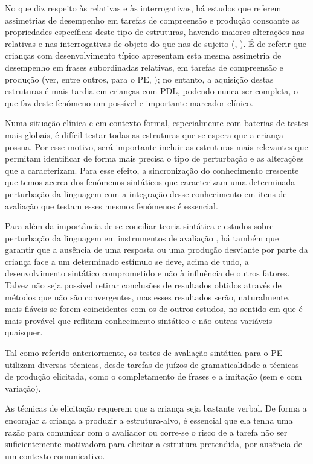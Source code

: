 \documentclass[output=paper,colorlinks,citecolor=brown,booklanguage=portuguese]{langscibook}
\begin{document}
No que diz respeito às relativas e às interrogativas, há estudos que referem assimetrias de desempenho em tarefas de compreensão e produção consoante as propriedades específicas deste tipo de estruturas, havendo maiores alterações nas relativas e nas interrogativas de objeto do que nas de sujeito (\citealp{Friedmann2011, Costa2009, Martins2018}, ). É de referir que crianças com desenvolvimento típico apresentam esta mesma assimetria de desempenho em frases subordinadas relativas, em tarefas de compreensão e produção (ver, entre outros, para o PE, \citealp{Vasconcelos1991, Costa2011}); no entanto, a aquisição destas estruturas é mais tardia em crianças com PDL, podendo nunca ser completa, o que faz deste fenómeno um possível e importante marcador clínico. 

Numa situação clínica e em contexto formal, especialmente com baterias de testes mais globais, é difícil testar todas as estruturas que se espera que a criança possua. Por esse motivo, será importante incluir as estruturas mais relevantes que permitam identificar de forma mais precisa o tipo de perturbação e as alterações que a caracterizam.  Para esse efeito, a sincronização do conhecimento crescente que temos acerca dos fenómenos sintáticos que caracterizam uma determinada perturbação da linguagem com a integração desse conhecimento em itens de avaliação que testam esses mesmos fenómenos é essencial.

Para além da importância de se conciliar teoria sintática e estudos sobre perturbação da linguagem em instrumentos de avaliação \citep{Costa2016}, há também que garantir que a ausência de uma resposta ou uma produção desviante por parte da criança face a um determinado estímulo se deve, acima de tudo, a desenvolvimento sintático comprometido e não à influência de outros fatores. Talvez não seja possível retirar conclusões de resultados obtidos através de métodos que não são convergentes, mas esses resultados serão, naturalmente, mais fiáveis se forem coincidentes com os de outros estudos, no sentido em que é mais provável que reflitam conhecimento sintático e não outras variáveis quaisquer.

Tal como referido anteriormente, os testes de avaliação sintática para o PE utilizam diversas técnicas, desde tarefas de juízos de gramaticalidade a técnicas de produção elicitada, como o completamento de frases e a imitação (sem e com variação). 

As técnicas de elicitação requerem que a criança seja bastante verbal. De forma a encorajar a criança a produzir a estrutura-alvo, é essencial que ela tenha uma razão para comunicar com o avaliador ou corre-se o risco de a tarefa não ser suficientemente motivadora para elicitar a estrutura pretendida, por ausência de um contexto comunicativo.
\end{document}
